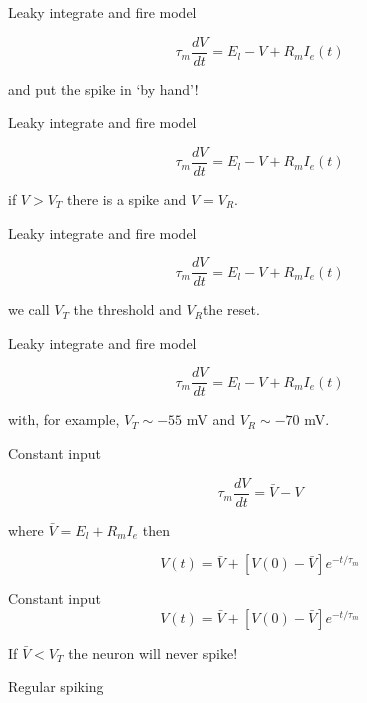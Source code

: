 \documentclass{beamer}
\newcommand{\crish}{\color{reddish}}
\newcommand{\cbla}{\color{black}}
\newcommand{\cblu}{\color{blue}}
\begin{document}
\begin{frame}{Leaky integrate and fire model}

  \crish
  $$\tau_m\frac{dV}{dt}=E_l-V+R_mI_e(t)$$
  \cbla

and put the spike in `by hand'!
  
\end{frame}


\begin{frame}{Leaky integrate and fire model}

  \crish
  $$\tau_m\frac{dV}{dt}=E_l-V+R_mI_e(t)$$
  \cbla

  if \crish{}$V>V_T$\cbla{} there is a \cblu{}spike\cbla{} and \crish{}$V=V_R$\cbla{}.
  
\end{frame}


\begin{frame}{Leaky integrate and fire model}

  \crish
  $$\tau_m\frac{dV}{dt}=E_l-V+R_mI_e(t)$$
  \cbla

  we call \crish{}$V_T $\cbla{} the \cblu{}threshold\cbla{} and
  \crish{}$V_R$\cbla the \cblu{} reset\cbla{}.
  
\end{frame}


\begin{frame}{Leaky integrate and fire model}

  \crish
  $$\tau_m\frac{dV}{dt}=E_l-V+R_mI_e(t)$$
  \cbla

  with, for example, \crish{}$V_T\sim-55 $ mV\cbla{} and \crish{}$V_R\sim-70$ mV\cbla.
  
\end{frame}

\begin{frame}{Constant input}

  \crish
  $$\tau_m\frac{dV}{dt}=\bar{V}-V$$
  \cbla{}

  where \crish{}$\bar{V}=E_l+R_mI_e$\cbla{} then\crish{}

  $$V(t)=\bar{V}+[V(0)-\bar{V}]e^{-t/\tau_m}$$
\cbla{}
\end{frame}

\begin{frame}{Constant input}
\crish{}
  $$V(t)=\bar{V}+[V(0)-\bar{V}]e^{-t/\tau_m}$$
\cbla{}

If \crish{}$\bar{V}<V_T$\cbla{} the neuron will never spike!
  
\end{frame}


\begin{frame}{Regular spiking}
  \begin{center}
    
\end{center}
  \end{frame}
\end{document}
